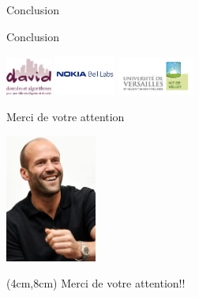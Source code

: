 \documentclass[10 pt]{beamer}
\begin{document}
\begin{section}{Conclusion}
\begin{frame}{Conclusion}
\begin{itemize}
\end{itemize}
\vspace{1cm}
 \centering
  \includegraphics [width=15mm]{logod.png} \hspace{1,5cm} \includegraphics [width=20mm]{logon.png} \hspace{1cm} \includegraphics [width=25mm]{logos/logo_iut.jpg} \\
\end{frame}


\begin{frame}{Merci de votre attention}
\begin{center}
  \includegraphics [width=30mm]{logos/jason.jpg}
 \begin{textblock*}{5cm}(4cm,8cm) %
  Merci de votre attention!!
  \end{textblock*}
  \end{center}
\end{frame}


\end{section}
\end{document}
